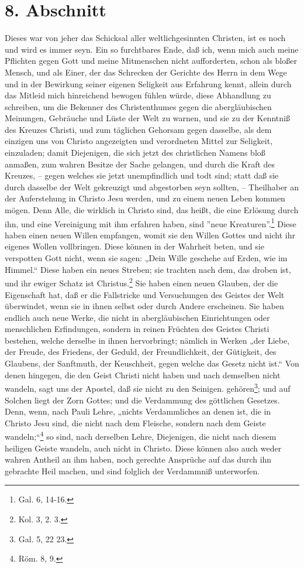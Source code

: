 \section{8. Abschnitt}

Dieses war von jeher das Schicksal aller weltlichgesinnten Christen, ist es noch und wird es immer seyn. Ein so furchtbares Ende, daß ich, wenn mich auch meine Pflichten gegen Gott und meine Mitmenschen nicht aufforderten, schon als bloßer Mensch, und als Einer, der das Schrecken der Gerichte des Herrn in dem Wege und in der Bewirkung seiner eigenen Seligkeit aus Erfahrung kennt, allein durch das Mitleid mich hinreichend bewogen fühlen würde, diese Abhandlung zu schreiben, um die Bekenner des Christenthumes gegen die abergläubischen Meinungen, Gebräuche und Lüste der Welt zu warnen, und sie zu der Kenntniß des Kreuzes Christi, und zum täglichen Gehorsam gegen dasselbe, als dem einzigen uns von Christo angezeigten und verordneten Mittel zur Seligkeit, einzuladen; damit Diejenigen, die sich jetzt des christlichen Namens bloß anmaßen, zum wahren Besitze der Sache gelangen, und durch die Kraft des Kreuzes, – gegen welches sie jetzt unempfindlich und todt sind; statt daß sie durch dasselbe der Welt gekreuzigt und abgestorben seyn sollten, – Theilhaber an der Auferstehung in Christo Jesu werden, und zu einem neuen Leben kommen mögen. Denn Alle, die wirklich in Christo sind, das heißt, die eine Erlösung durch ihn, und eine Vereinigung mit ihm erfahren haben, sind ''neue Kreaturen''.\footnote{Gal. 6, 14-16.} Diese haben einen neuen Willen empfangen, womit sie den Willen Gottes und nicht ihr eigenes Wollen vollbringen. Diese können in der Wahrheit beten, und sie verspotten Gott nicht, wenn sie sagen: „Dein Wille geschehe auf Erden, wie im Himmel.“ Diese haben ein neues Streben; sie trachten nach dem, das droben ist, und ihr ewiger Schatz ist Christus.\footnote{Kol. 3, 2. 3.} Sie haben einen neuen Glauben, der die Eigenschaft hat, daß er die Fallstricke und Versuchungen des Geistes der Welt überwindet, wenn sie in ihnen selbst oder durch Andere erscheinen. Sie haben endlich auch neue Werke, die nicht in abergläubischen Einrichtungen oder menschlichen Erfindungen, sondern in reinen Früchten des Geistes Christi bestehen, welche derselbe in ihnen hervorbringt; nämlich in Werken „der Liebe, der Freude, des Friedens, der Geduld, der Freundlichkeit, der Gütigkeit, des Glaubens, der Sanftmuth, der Keuschheit, gegen welche das Gesetz nicht ist.“ Von denen hingegen, die den Geist Christi nicht haben und nach demselben nicht wandeln, sagt uns der Apostel, daß sie nicht zu den Seinigen. gehören\footnote{Gal. 5, 22 23.}; und auf Solchen liegt der Zorn Gottes; und die Verdammung des göttlichen Gesetzes. Denn, wenn, nach Pauli Lehre, „nichts Verdammliches an denen ist, die in Christo Jesu sind, die nicht nach dem Fleische, sondern nach dem Geiste wandeln;“\footnote{Röm. 8, 9.} so sind, nach derselben Lehre, Diejenigen, die nicht nach diesem heiligen Geiste wandeln, auch nicht in Christo. Diese können also auch weder wahren Antheil an ihm haben, noch gerechte Ansprüche auf das durch ihn gebrachte Heil machen, und sind folglich der Verdammniß unterworfen.

